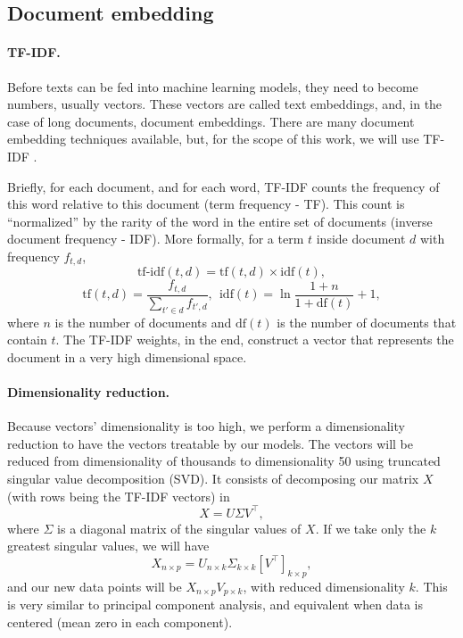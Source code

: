 \subsection{Document embedding}
    \label{sec:document_embedding}

    \paragraph{TF-IDF.} Before texts can be fed into machine learning models, they need to become numbers, usually vectors. These vectors are called text embeddings, and, in the case of long documents, document embeddings. There are many document embedding techniques available, but, for the scope of this work, we will use TF-IDF \cite{robertson2004understanding}.

    Briefly, for each document, and for each word, TF-IDF counts the frequency of this word relative to this document (term frequency - TF). This count is ``normalized'' by the rarity of the word in the entire set of documents (inverse document frequency - IDF). More formally, for a term $t$ inside document $d$ with frequency $f_{t, d}$,
    \[\text{tf-idf}(t, d) = \text{tf}(t, d) \times \text{idf}(t),\]
    \[\text{tf}(t, d) = \frac{f_{t, d}}{\sum_{t' \in d} f_{t', d}}, \ \ \text{idf}(t) = \ln \frac{1+n}{1+\text{df}(t)}+1,\]                  
    where $n$ is the number of documents and $\text{df}(t)$ is the number of documents that contain $t$. The TF-IDF weights, in the end, construct a vector that represents the document in a very high dimensional space.

    \paragraph{Dimensionality reduction.} Because vectors' dimensionality is too high, we perform a dimensionality reduction to have the vectors treatable by our models. The vectors will be reduced from dimensionality of thousands to dimensionality 50 using truncated singular value decomposition (SVD). It consists of decomposing our matrix $X$ (with rows being the TF-IDF vectors) in
    \[X = U \Sigma V^\intercal,\]                  
    where $\Sigma$ is a diagonal matrix of the singular values of $X$. If we take only the $k$ greatest singular values, we will have
    \[X_{n \times p} = U_{n \times k} \Sigma_{k \times k} \left[V^\intercal\right]_{k \times p},\]                  
    and our new data points will be $X_{n \times p} V_{p \times k}$, with reduced dimensionality $k$. This is very similar to principal component analysis, and equivalent when data is centered (mean zero in each component).

